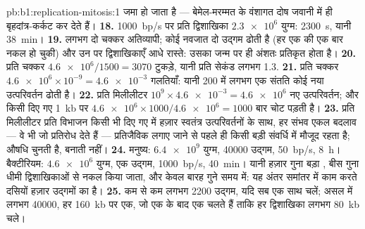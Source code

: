 \begin{solution}{pb:b1:replication-mitosis:1}
जमा हो जाता है --- बेमेल-मरम्मत के वंशागत दोष
जवानी में ही बृहदांत्र-कर्कट कर देते हैं।
\textbf{18.} \qty{1000}{bp/s} पर प्रति द्विशाखिका $\num{2.3e6}$ युग्म:
\qty{2300}{s}, यानी \qty{38}{min}।
\textbf{19.} लगभग दो चक्कर अतिव्यापी; कोई नवजात 
दो उद्गम ढोती है (हर एक की एक बार नकल हो चुकी) और उन पर द्विशाखिकाएँ आधे
रास्ते: उसका  जन्म पर ही अंशतः प्रतिकृत होता है।
\textbf{20.} प्रति चक्कर $\num{4.6e6}/1500 = 3070$ टुकड़े, यानी प्रति
सेकंड लगभग 1.3.
\textbf{21.} प्रति चक्कर $\num{4.6e6}\times 10^{-9} = \num{4.6e-3}$
गलतियाँ: यानी 200 में लगभग एक संतति कोई नया उत्परिवर्तन ढोती है।
\textbf{22.} प्रति मिलीलीटर $10^9\times\num{4.6e-3} = \num{4.6e6}$ नए
उत्परिवर्तन; और किसी दिए गए \qty{1}{kb}  पर $\num{4.6e6}\times
1000/\num{4.6e6} = 1000$ बार चोट पड़ती है।
\textbf{23.} प्रति मिलीलीटर प्रति विभाजन किसी भी दिए गए  में हज़ार
स्वतंत्र उत्परिवर्तनों के साथ, हर संभव एकल बदलाव --- वे भी जो
प्रतिरोध देते हैं --- प्रतिजैविक लगाए जाने से पहले ही किसी बड़ी
संवर्धि में मौजूद रहता है; औषधि चुनती है, बनाती
नहीं।
\textbf{24.} मनुष्य: $\num{6.4e9}$ युग्म, \num{40000} उद्गम,
\qty{50}{bp/s}, \qty{8}{h}। बैक्टीरियम: $\num{4.6e6}$ युग्म, एक उद्गम,
\qty{1000}{bp/s}, \qty{40}{min}। यानी हज़ार गुना बड़ा , बीस गुना
धीमी द्विशाखिकाओं से नकल किया जाता, और केवल बारह गुने समय में:
यह अंतर समांतर में काम करते दसियों हज़ार उद्गमों का
है।
\textbf{25.} कम से कम लगभग \num{2200} उद्गम, यदि सब एक साथ चलें;
असल में लगभग \num{40000}, हर \qty{160}{kb} पर एक, जो एक के बाद एक
चलते हैं ताकि हर द्विशाखिका लगभग \qty{80}{kb} चले।
\end{solution}
